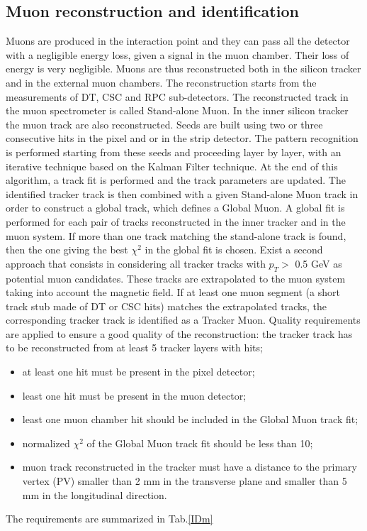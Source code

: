 \subsection*{Muon reconstruction and identification}
Muons are produced in the interaction point and they can pass all the detector with a negligible energy loss, given a signal in the muon chamber.
Their loss of energy is very negligible. 
Muons are thus reconstructed both in the silicon tracker and in the external muon chambers. 
The reconstruction starts from the measurements of DT, CSC and RPC sub-detectors. The reconstructed track in the muon spectrometer is called
Stand-alone Muon.
In the inner silicon tracker the muon track are also reconstructed. Seeds are
built using two or three consecutive hits in the pixel and or in the strip detector. 
The pattern recognition is performed starting from these seeds and proceeding layer by layer,
with an iterative technique based on the Kalman Filter technique.
At the end of this algorithm, a track fit is performed and the track parameters are updated. The identified
tracker track is then combined with a given Stand-alone Muon track in order to construct
a global track, which defines a Global Muon. A global fit is performed for each pair of
tracks reconstructed in the inner tracker and in the muon system. If more than one track
matching the stand-alone track is found, then the one giving the best $\chi^2$ in the global fit
is chosen. Exist a second approach that consists in considering all tracker tracks with $p_T>$ 0.5 GeV as
potential muon candidates. These tracks are extrapolated to the muon system taking
into account the magnetic field. If at least one muon segment (a short track stub made of
DT or CSC hits) matches the extrapolated tracks, the corresponding tracker track is
identified as a Tracker Muon.
Quality requirements are applied to ensure a good quality of the reconstruction:
the tracker track has to be reconstructed from at least 5 tracker layers with hits;
\begin{itemize}
 \item at least one hit must be present in the pixel detector;
 \item least one hit must be present in the muon detector;
 \item least one muon chamber hit should be included in the Global Muon track fit;
 \item normalized $\chi^2$ of the Global Muon track fit should be less than 10;
 \item muon track reconstructed in the tracker must have a distance to the primary
vertex (PV) smaller than 2 mm in the transverse plane and smaller than 5 mm in
the longitudinal direction.
\end{itemize}
The requirements are summarized in Tab.\ref{IDm}

